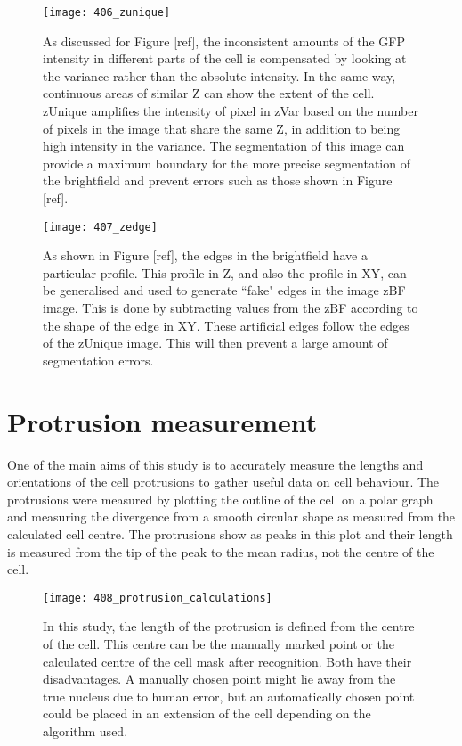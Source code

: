 \begin{figure}[h!]
 \centering
 \texttt{[image: 406\_zunique]}
 \caption[zUnique example]{
 	As discussed for Figure [ref], the inconsistent amounts of the GFP intensity in different parts of the cell is compensated by looking at the variance rather than the absolute intensity. In the same way, continuous areas of similar Z can show the extent of the cell. zUnique amplifies the intensity of pixel in zVar based on the number of pixels in the image that share the same Z, in addition to being high intensity in the variance. The segmentation of this image can provide a maximum boundary for the more precise segmentation of the brightfield and prevent errors such as those shown in Figure [ref].
 }
 \label{fig:zunique}
\end{figure}

\begin{figure}[h!]
 \centering
 \texttt{[image: 407\_zedge]}
 \caption[zEdge example]{
 	As shown in Figure [ref], the edges in the brightfield have a particular profile. This profile in Z, and also the profile in XY, can be generalised and used to generate ``fake" edges in the image zBF image. This is done by subtracting values from the zBF according to the shape of the edge in XY. These artificial edges follow the edges of the zUnique image. This will then prevent a large amount of segmentation errors.
 }
 \label{fig:zedge}
\end{figure}

\section{Protrusion measurement}

One of the main aims of this study is to accurately measure the lengths and orientations of the cell protrusions to gather useful data on cell behaviour. The protrusions were measured by plotting the outline of the cell on a polar graph and measuring the divergence from a smooth circular shape as measured from the calculated cell centre. The protrusions show as peaks in this plot and their length is measured from the tip of the peak to the mean radius, not the centre of the cell.

\begin{figure}[h!]
 \centering
 \texttt{[image: 408\_protrusion\_calculations]}
 \caption[Protrusion calulation]{
 	In this study, the length of the protrusion is defined from the centre of the cell. This centre can be the manually marked point or the calculated centre of the cell mask after recognition. Both have their disadvantages. A manually chosen point might lie away from the true nucleus due to human error, but an automatically chosen point could be placed in an extension of the cell depending on the algorithm used.
 }
 \label{fig:protrusioncalc}
\end{figure}

